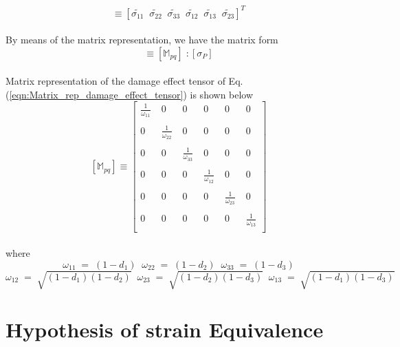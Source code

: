 \documentclass[12pt,twoside]{report}
\begin{document}
\begin{equation}
   [\tilde{\sigma_{P}}]  \equiv  [\tilde{\sigma_{11}} \;\; \tilde{\sigma_{22}} \;\;\tilde{\sigma_{33}} \;\;\tilde{\sigma_{12}} \;\;\tilde{\sigma_{13}} \;\;\tilde{\sigma_{23}} ]^{T}
\end{equation}
\\
By means of the matrix representation, we have the matrix form
\begin{equation}
[\tilde{\sigma_{P}}] \equiv [\mathbb{M}_{pq}]\;: [\sigma_{P}]
\label{eqn:Matrix_rep_damage_effect_tensor}
\end{equation}
\\
Matrix representation of the damage effect tensor of Eq.(\ref{eqn:Matrix_rep_damage_effect_tensor}) is shown below
\\
$$
[\mathbb{M}_{pq}] \equiv   
 \begin{bmatrix}
   \frac{1}{\omega_{11}}  \; & 0 \; & 0 \; & 0 \; & 0\; & 0 \\
  \\
  0\; & \frac{1}{\omega_{22}}\; & 0\; & 0\; & 0\; & 0 \\
  \\
  0\; & 0 \; & \frac{1}{\omega_{33}}\; & 0\; & 0\; & 0 \\
  \\
  0\; & 0\; & 0\; & \frac{1}{\omega_{12}}\; & 0\; & 0 \\
  \\
  0\; & 0\; & 0\; & 0\; & \frac{1}{\omega_{23}}\; & 0 \\
  \\
  0\; & 0\; & 0\; & 0\; & 0\; & \frac{1}{\omega_{13}}  
  \\
 \end{bmatrix}
 \label{Damage_effect_tensor}
 $$
\\
where
$$\omega_{11} \; = \; (1 - d_{1}) \;\;  \omega_{22} \; = \; (1 - d_{2}) \;\; \omega_{33} \; = \; (1 - d_{3})$$ \vspace*{0.1cm} $$\omega_{12} \; = \; \sqrt{(1 - d_{1})(1 - d_{2})}  \;\;\omega_{23} \; = \; \sqrt{(1 - d_{2})(1 - d_{3})} \;\; \omega_{13} \; = \; \sqrt{(1 - d_{1})(1 - d_{3})}$$

\section{Hypothesis of strain Equivalence}\label{Hypothesis of Strain Equivalence}
\end{document}

